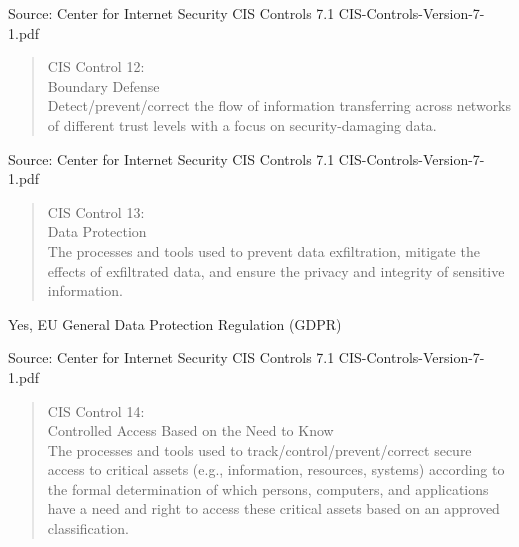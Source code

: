 \documentclass[Screen16to9,17pt]{foils}
\begin{document}
Source: Center for Internet Security CIS Controls 7.1 CIS-Controls-Version-7-1.pdf


\begin{quote}
CIS Control 12:\\
Boundary Defense\\
Detect/prevent/correct the flow of information transferring across networks of different trust levels with a focus on security-damaging data.
\end{quote}

\begin{list1}
\item
\item
\item
\item
\end{list1}

Source: Center for Internet Security CIS Controls 7.1 CIS-Controls-Version-7-1.pdf


\begin{quote}
CIS Control 13:\\
Data Protection\\
The processes and tools used to prevent data exfiltration, mitigate the effects of exfiltrated data, and ensure the privacy and integrity of sensitive information.
\end{quote}

\begin{list1}
\item Yes, EU General Data Protection Regulation (GDPR)
\item
\item
\item
\end{list1}

Source: Center for Internet Security CIS Controls 7.1 CIS-Controls-Version-7-1.pdf


\begin{quote}
CIS Control 14:\\
Controlled Access Based on the Need to Know\\
The processes and tools used to track/control/prevent/correct secure access to critical assets (e.g., information, resources, systems) according to the formal determination of which persons, computers, and applications have a need and right to access these critical assets based on an approved classification.
\end{quote}
\end{document}
